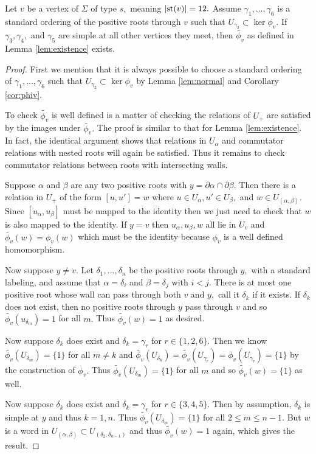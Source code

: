 \documentclass[class=book, crop=false]{standalone}
\begin{document}
\begin{lemma} 
	\label{lem:336f2ex}
	Let $v$ be a vertex of $\Sigma$ of type $s,$ meaning $|\mathrm{st}(v)|=12.$ Assume $\gamma_1,\dots,\gamma_6$ is a standard ordering of the positive roots through $v$ such that $U_{\gamma_2}\subset \ker \phi_v.$ If $\gamma_3,\gamma_4,$ and $\gamma_5$ are simple at all other vertices they meet, then $\tilde{\phi_v}$ as defined in Lemma \ref{lem:existence} exists.
\end{lemma}
\begin{proof}
	First we mention that it is always possible to choose a standard ordering of $\gamma_1,\dots,\gamma_6$ such that $U_{\gamma_2}\subset \ker\phi_v$ by Lemma \ref{lem:normal} and Corollary \ref{cor:phiv}.

	To check $\tilde{\phi_v}$ is well defined is a matter of checking the relations of $U_+$ are satisfied by the images under $\tilde{\phi_v}.$ The proof is similar to that for Lemma \ref{lem:existence}. In fact, the identical argument shows that relations in $U_\alpha$ and commutator relations with nested roots will again be satisfied. Thus it remains to check commutator relations between roots with intersecting walls.

	Suppose $\alpha$ and $\beta$ are any two positive roots with $y=\partial\alpha\cap \partial\beta.$ Then there is a relation in $U_+$ of the form $[u,u']=w$ where $u\in U_\alpha, u'\in U_\beta,$ and $w\in U_{(\alpha,\beta)}.$ Since $[u_\alpha,u_\beta]$ must be mapped to the identity then we just need to check that $w$ is also mapped to the identity. If $y=v$ then $u_\alpha,u_\beta,w$ all lie in $U_v$ and $\tilde{\phi_v}(w)=\phi_v(w)$ which must be the identity because $\phi_v$ is a well defined homomorphism.

	Now suppose $y\neq v.$ Let $\delta_1,\dots,\delta_n$ be the positive roots through $y,$ with a standard labeling, and assume that $\alpha=\delta_i$ and $\beta=\delta_j$ with $i<j.$ There is at most one positive root whose wall can pass through both $v$ and $y,$ call it $\delta_k$ if it exists. If $\delta_k$ does not exist, then no positive roots through $y$ pass through $v$ and so $\tilde{\phi_v}(u_{\delta_m})=1$ for all $m.$ Thus $\tilde{\phi_v}(w)=1$ as desired.

	Now suppose $\delta_k$ does exist and $\delta_k=\gamma_r$ for $r\in \{1,2,6\}.$ Then we know $\tilde{\phi_v}(U_{\delta_m})=\{1\}$ for all  $m\neq k$ and $\tilde{\phi_v}(U_{\delta_k})=\tilde{\phi_v}(U_{\gamma_r})=\phi_v(U_{\gamma_r})=\{1\}$ by the construction of $\phi_v.$ Thus $\tilde{\phi_v}(U_{\delta_m})=\{1\}$ for all $m$ and so $\tilde{\phi_v}(w)=\{1\}$ as well.

	Now suppose $\delta_k$ does exist and $\delta_k=\gamma_r$ for $r\in \{3,4,5\}.$ Then by assumption, $\delta_k$ is simple at $y$ and thus $k=1,n.$ Thus $\tilde{\phi_v}(U_{\delta_m})=\{1\}$ for all $2\le m\le n-1.$ But $w$ is a word in $U_{(\alpha,\beta)}\subset U_{(\delta_2,\delta_{n-1})}$ and thus $\tilde{\phi_v}(w)=1$ again, which gives the result.
\end{proof}
\end{document}
